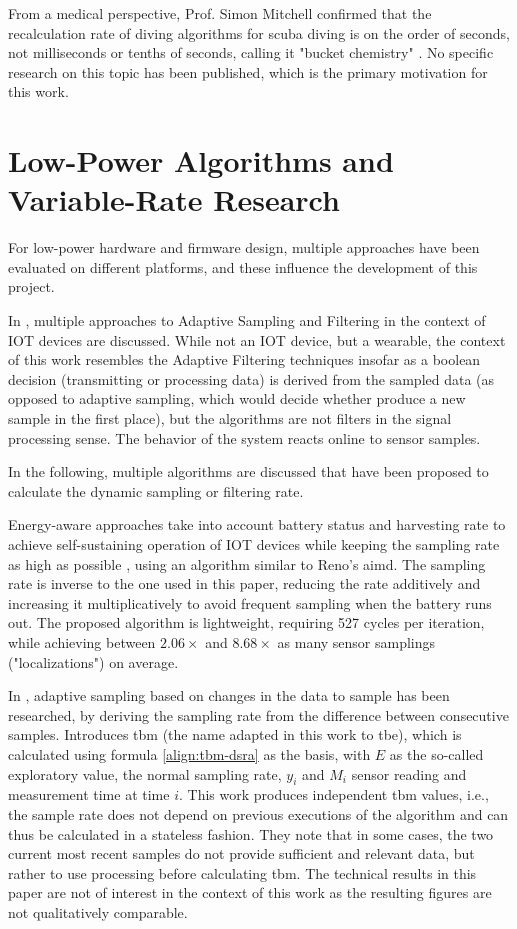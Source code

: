 From a medical perspective, Prof. Simon Mitchell confirmed that the recalculation rate of diving algorithms for scuba diving is on the order of seconds, not milliseconds or tenths of seconds, calling it "bucket chemistry" \cite{2025-mitchell-personal-comm}. 
No specific research on this topic has been published, which is the primary motivation for this work.
\section{Low-Power Algorithms and Variable-Rate Research}
For low-power hardware and firmware design, multiple approaches have been evaluated on different platforms, and these influence the development of this project.

In \cite{survey-adaptive-sampling-filtering}, multiple approaches to Adaptive Sampling and Filtering in the context of IOT devices are discussed. 
While not an IOT device, but a wearable, the context of this work resembles the Adaptive Filtering techniques insofar as a boolean decision (transmitting or processing data) is derived from the sampled data (as opposed to adaptive sampling, which would decide whether produce a new sample in the first place), but the algorithms are not filters in the signal processing sense.
The behavior of the system reacts online to sensor samples.

In the following, multiple algorithms are discussed that have been proposed to calculate the dynamic sampling or filtering rate.

Energy-aware approaches take into account battery status and harvesting rate to achieve self-sustaining operation of IOT devices while keeping the sampling rate as high as possible \cite{2023-eth-energy-aware}, using an algorithm  similar to Reno's \gls{aimd}.
The sampling rate is inverse to the one used in this paper, reducing the rate additively and increasing it multiplicatively to avoid frequent sampling when the battery runs out.
The proposed algorithm is lightweight, requiring 527 cycles per iteration, while achieving between $2.06\times$ and $8.68\times$ as many sensor samplings ("localizations") on average.

In \cite{2020-dsra}, adaptive sampling based on changes in the data to sample has been researched, by deriving the sampling rate from the difference between consecutive samples. 
Introduces \gls{tbm} (the name adapted in this work to \gls{tbe}), which is calculated using formula \ref{align:tbm-dsra} as the basis, with $E$ as the so-called exploratory value, the normal sampling rate, $y_i$ and $M_i$ sensor reading and measurement time at time $i$. 
This work produces independent \gls{tbm} values, i.e., the sample rate does not depend on previous executions of the algorithm and can thus be calculated in a stateless fashion.
They note that in some cases, the two current most recent samples do not provide sufficient and relevant data, but rather to use processing before calculating \gls{tbm}. 
The technical results in this paper are not of interest in the context of this work as the resulting figures are not qualitatively comparable.

